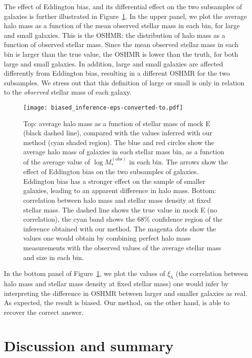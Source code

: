 \documentclass[usenatbib]{mnras}
\def\mobs{M_*^{\mathrm{(obs)}}}
\def\Fref#1{Figure~\ref{#1}\xspace}
\begin{document}
The effect of Eddington bias, and its differential effect on the two subsamples of galaxies is further illustrated in \Fref{fig:biased_inference}.
In the upper panel, we plot the average halo mass as a function of the mean observed stellar mass in each bin, for large and small galaxies.
This is the OSHMR: the distribution of halo mass as a function of observed stellar mass.
Since the mean observed stellar mass in each bin is larger than the true value, the OSHMR is lower than the truth, for both large and small galaxies.
In addition, large and small galaxies are affected differently from Eddington bias, resulting in a different OSHMR for the two subsamples. 
We stress out that this definition of large or small is only in relation to the {\em observed} stellar mass of each galaxy.
%
\begin{figure}
 \texttt{[image: biased\_inference-eps-converted-to.pdf]}
 \caption{
{\rm Top:} average halo mass as a function of stellar mass of mock E (black dashed line), compared with the values inferred with our method (cyan shaded region). The blue and red circles show the average halo mass of galaxies in each stellar mass bin, as a function of the average value of $\log{\mobs}$ in each bin. The arrows show the effect of Eddington bias on the two subsamples of galaxies. Eddington bias has a stronger effect on the sample of smaller galaxies, leading to an apparent difference in halo mass.
{\rm Bottom:} correlation between halo mass and stellar mass density at fixed stellar mass. The dashed line shows the true value in mock E (no correlation), the cyan band shows the 68\% confidence region of the inference obtained with our method. The magenta dots show the values one would obtain by combining perfect halo mass measurements with the observed values of the average stellar mass and size in each bin.
\label{fig:biased_inference}}
\end{figure}
%

In the bottom panel of \Fref{fig:biased_inference}, we plot the values of $\xi_h$ (the correlation between halo mass and stellar mass density at fixed stellar mass) one would infer by interpreting the difference in OSHMR between larger and smaller galaxies as real.
As expected, the result is biased.
Our method, on the other hand, is able to recover the correct answer.

\section{Discussion and summary}\label{sect:discuss}
\end{document}

